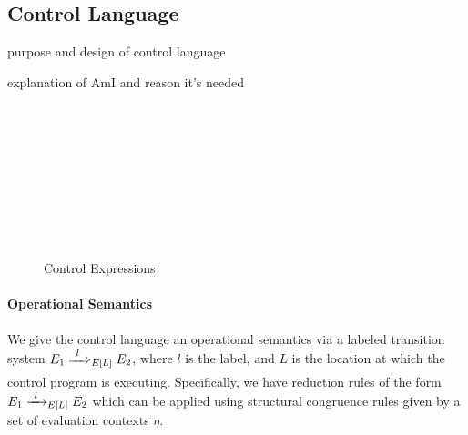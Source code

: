 \subsection{Control Language}
\label{sec:control-lang}

\todo purpose and design of control language

\todo explanation of AmI and reason it's needed

\begin{figure}
  \begin{syntax}
     \alternative{\CtrlFail}   \\
      \\
      \\
     \alternative{\RecvFrom{\ell}} \\
     \\
     \\
     \\
    \\

    \alternative{\CtrlFail}  

    \alternative{\CtrlNone}

    \abstractCategory[Systems]{\Pi}
  \end{syntax}

  \caption{Control Expressions}
  \label{fig:control-lang-syntax}
\end{figure}

\paragraph{Operational Semantics}
\label{sec:control-lang-semantics}
We give the control language an operational semantics via a labeled transition system $E_1 \ctrlstep[l] E_2$, where $l$ is the label, and $L$ is the location at which the control program is executing.
Specifically, we have reduction rules of the form $E_1 \ctrlreduce[l] E_2$ which can be applied using structural congruence rules given by a set of evaluation contexts $\eta$.


